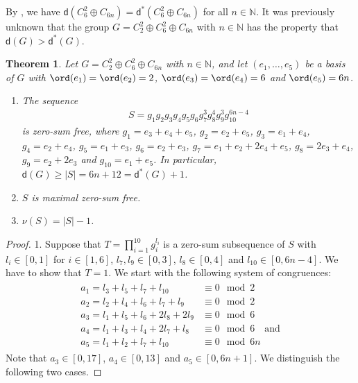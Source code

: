 \documentclass[a4paper, 10pt]{amsart}
\theoremstyle{plain}
\newtheorem{theorem}{\bf Theorem}[section]
\theoremstyle{definition}
\newcommand{\N}{\mathbb N}
\numberwithin{equation}{section}
\begin{document}
{ 

By \cite[Theorem 4.1]{Sc11b}, we have $\mathsf d (C_6^2 \oplus C_{6n}) = \mathsf d^* (C_6^2 \oplus C_{6n})$ for all $n \in \N$.
It was previously unknown that the group  $G = C_2^2 \oplus C_6^2 \oplus C_{6n}$ with $n \in \N$ has the property that $\mathsf d (G) > \mathsf d^* (G)$. 
 


\begin{theorem} \label{6.5}
Let $G = C_2^2 \oplus C_6^2 \oplus C_{6n}$ with $n \in \N$, and let $(e_1, \ldots, e_5)$ be a basis of $G$ with $\ord (e_1) = \ord
(e_2) = 2$, $\ord (e_3) = \ord (e_4) = 6$ and $\ord (e_5) = 6n$.
\begin{enumerate}
\item The sequence 
      \begin{align*}
      S =   g_1 g_2 g_3 g_4 g_5 g_6  g_7^3 g_8^4 g_9^3 g_{10}^{6n-4} 
      \end{align*}
      is zero-sum free, where $g_1 = e_3+e_4+e_5$, $g_2 = e_2+e_5$, $g_3 =
      e_1+e_4$, $g_4 = e_2+e_4$, $g_5 = e_1+e_3$, $g_6=e_2+e_3$, $g_7 =
      e_1+e_2+2e_4+e_5$, $g_8 = 2e_3+e_4$, $g_9 = e_2+2e_3$ and $g_{10} =
      e_1+e_5$.  In particular, $\mathsf d (G) \ge |S|  = 6n+12 = \mathsf d^* (G)+1$.
      
\item $S$ is maximal zero-sum free.

\item $\nu (S) = |S| -1$.
\end{enumerate}      
\end{theorem}

\begin{proof}
1. Suppose that  $T = \prod_{i=1}^{10} g_i^{l_i}$ is a zero-sum
subsequence of $S$ with $l_i \in [0,1]$ for $i \in [1,6]$, $l_7, l_9
\in [0,3]$, $l_8 \in [0,4]$ and $l_{10} \in [0, 6n-4]$. We have to
show that $T = 1$. We start with the following system of
congruences:
\begin{align*}
\begin{aligned}
a_1 = l_3+l_5+l_7+l_{10} & \equiv 0 \mod 2 \\
a_2 = l_2+l_4+l_6+l_7+l_9 & \equiv 0 \mod 2 \\
a_3 = l_1+l_5+l_6+ 2l_8 + 2l_9 & \equiv 0 \mod 6 \\
a_4 = l_1+l_3+l_4+2l_7+l_8 & \equiv 0 \mod 6  \quad \text{and} \\
a_5 = l_1+l_2+l_7+l_{10} & \equiv 0 \mod 6n
\end{aligned}
\end{align*}
Note that $a_3 \in [0, 17]$, $a_4 \in [0, 13]$ and $a_5 \in [0,
6n+1]$. We distinguish the following two cases.



\end{proof}}
\end{document}
